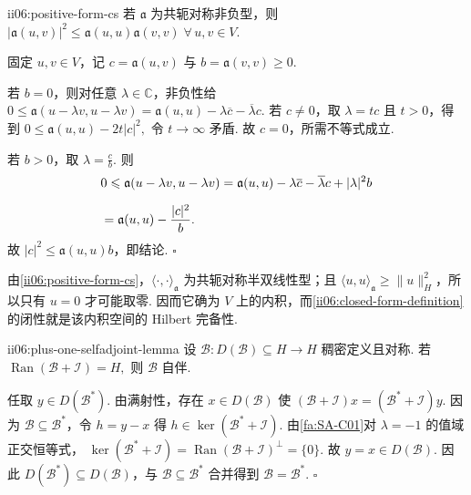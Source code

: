\begin{FAProposition}{ii06:positive-form-cs}
若 \(\displaystyle\mathfrak a\) 为共轭对称非负型，则
\(\displaystyle |\mathfrak a(u,v)|^2 \leqslant \mathfrak a(u,u)\mathfrak a(v,v) \; \forall\,u,v\in V.\)
\end{FAProposition}

\begin{FAProof}
固定 \(\displaystyle u,v\in V\)，记 \(\displaystyle c=\mathfrak a(u,v)\) 与 \(\displaystyle b=\mathfrak a(v,v)\geqslant0\).

若 \(\displaystyle b=0\)，则对任意 \(\displaystyle\lambda\in\mathbb C\)，非负性给
\(\displaystyle 0 \leqslant \mathfrak a(u-\lambda v,u-\lambda v) = \mathfrak a(u,u)-\lambda\overline c-\overline\lambda c.\)
若 \(\displaystyle c\neq0\)，取 \(\displaystyle\lambda=t c\) 且 \(\displaystyle t>0\)，得到
\(\displaystyle 0 \leqslant \mathfrak a(u,u)-2t|c|^2,\)
令 \(\displaystyle t\to\infty\) 矛盾. 故 \(\displaystyle c=0\)，所需不等式成立.

若 \(\displaystyle b>0\)，取 \(\displaystyle\lambda=\frac{c}{b}\). 则
\[
\begin{aligned}
\displaystyle &\displaystyle 0\leqslant\mathfrak a(u-\lambda v,u-\lambda v)=\mathfrak a(u,u)-\lambda\overline c-\overline\lambda c+|\lambda|^2b\\[6pt]
\displaystyle &\displaystyle {}=\mathfrak a(u,u)-\frac{|c|^2}{b}.
\end{aligned}
\]
故 \(\displaystyle|c|^2\leqslant\mathfrak a(u,u)b\)，即结论.
\hfill\(\square\)
\end{FAProof}

由\autoref{ii06:positive-form-cs}，\(\displaystyle\langle\cdot,\cdot\rangle_{\mathfrak a}\) 为共轭对称半双线性型；且 \(\displaystyle\langle u,u\rangle_{\mathfrak a}\geqslant\|u\|_H^2\)，所以只有 \(\displaystyle u=0\) 才可能取零. 因而它确为 \(\displaystyle V\) 上的内积，而\autoref{ii06:closed-form-definition}的闭性就是该内积空间的 Hilbert 完备性.

\begin{FALemma}[B][满射正移位给出自伴性]{ii06:plus-one-selfadjoint-lemma}
设 \(\displaystyle\mathcal B:D(\mathcal B)\subseteq H\to H\) 稠密定义且对称. 若
\(\displaystyle \operatorname{Ran}(\mathcal B+\mathcal I)=H,\)
则 \(\displaystyle\mathcal B\) 自伴.
\end{FALemma}

\begin{FAProof}
任取 \(\displaystyle y\in D(\mathcal B^*)\). 由满射性，存在 \(\displaystyle x\in D(\mathcal B)\) 使
\(\displaystyle (\mathcal B+\mathcal I)x = (\mathcal B^*+\mathcal I)y.\)
因为 \(\displaystyle\mathcal B\subseteq\mathcal B^*\)，令 \(\displaystyle h=y-x\) 得
\(\displaystyle h\in\ker(\mathcal B^*+\mathcal I).\)
由\autoref{fa:SA-C01}对 \(\displaystyle\lambda=-1\) 的值域正交恒等式，
\(\displaystyle \ker(\mathcal B^*+\mathcal I) = \operatorname{Ran}(\mathcal B+\mathcal I)^\perp = \{0\}.\)
故 \(\displaystyle y=x\in D(\mathcal B)\). 因此 \(\displaystyle D(\mathcal B^*)\subseteq D(\mathcal B)\)，与 \(\displaystyle\mathcal B\subseteq\mathcal B^*\) 合并得到 \(\displaystyle\mathcal B=\mathcal B^*\).
\hfill\(\square\)
\end{FAProof}

